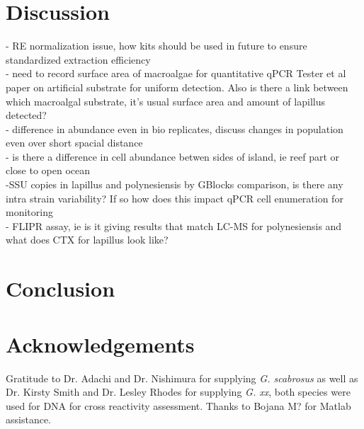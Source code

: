 \documentclass[12pt]{article}
\begin{document}
\section{Discussion}
- RE normalization issue, how kits should be used in future to ensure standardized extraction efficiency\\
- need to record surface area of macroalgae for quantitative qPCR Tester et al paper on artificial substrate for uniform detection. Also is there a link between which macroalgal substrate, it's usual surface area and amount of lapillus detected?\\
- difference in abundance even in bio replicates, discuss changes in population even over short spacial distance\\
- is there a difference in cell abundance betwen sides of island, ie reef part or close to open ocean\\
-SSU copies in lapillus and polynesiensis by GBlocks comparison, is there any intra strain variability? If so how does this impact qPCR cell enumeration for monitoring\\
- FLIPR assay, ie is it giving results that match LC-MS for polynesiensis and what does CTX for lapillus look like?
\newpage
\section{Conclusion}
\section{Acknowledgements}
Gratitude to Dr. Adachi and Dr. Nishimura for supplying \emph{G. scabrosus} as well as Dr. Kirsty Smith and Dr. Lesley Rhodes for supplying \emph{G. xx}, both species were used for DNA for cross reactivity assessment. Thanks to Bojana M? for Matlab assistance.
\FloatBarrier
\newpage


\end{document}

